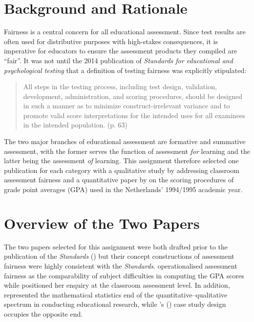 \documentclass[
    a4paper,            %
    12pt,               %
    stu,                %
    noextraspace,       %
    floatsintext,       %
    biblatex,           %
    colorlinks=true,        %
    linkcolor=red,          %
    anchorcolor=black,      %
    citecolor=blue,         %
    urlcolor=blue,          %
    bookmarks=true,         %
    bookmarksopen=false,    %
    bookmarksnumbered=true  %
    margin=2cm              %
]{apa7}
\newcommand{\poscite}[1]{\citeauthor{#1}'s (\citeyear{#1})}
\newenvironment{qt}{
    \begin{quotation}
        \vspace{-0.5\baselineskip}
}{
        \vspace{-0.5\baselineskip}
    \end{quotation}
}
\begin{document}
\section{Background and Rationale}

Fairness is a central concern for all educational assessment. Since test results are often used for distributive purposes with high-stakes consequences, it is imperative for educators to ensure the assessment products they compiled are ``fair''. It was not until the 2014 publication of \textit{Standards for educational and psychological testing} \parencite[the \textit{Standards},][]{standards:2014} that a definition of testing fairness was explicitly stipulated:
\begin{qt}
    \noindent All steps in the testing process, including test design, validation, development, administration, and scoring procedures, should be designed in such a manner as to minimize construct-irrelevant variance and to promote valid score interpretations for the intended uses for all examinees in the intended population. (p. 63)
\end{qt}

The two major branches of educational assessment are formative and summative assessment, with the former serves the function of assessment \emph{for} learning and the latter being the assessment \emph{of} learning. This assignment therefore selected one publication for each category with a qualitative study by \textcite{tierney:2014} addressing classroom assessment fairness and a quantitative paper by \textcite{korobko:2008} on the scoring procedures of grade point averages (GPA) used in the Netherlands' 1994/1995 academic year.

\section{Overview of the Two Papers}

The two papers selected for this assignment were both drafted prior to the publication of the \textit{Standards} (\citeyear{standards:2014}) but their concept constructions of assessment fairness were highly consistent with the \textit{Standards}. \textcite{korobko:2008} operationalised assessment fairness as the comparability of subject difficulties in computing the GPA scores while \textcite{tierney:2014} positioned her enquiry at the classroom assessment level. In addition, \textcite{korobko:2008} represented the mathematical statistics end of the quantitative--qualitative spectrum in conducting educational research, while \poscite{tierney:2014} case study design occupies the opposite end.
\end{document}
